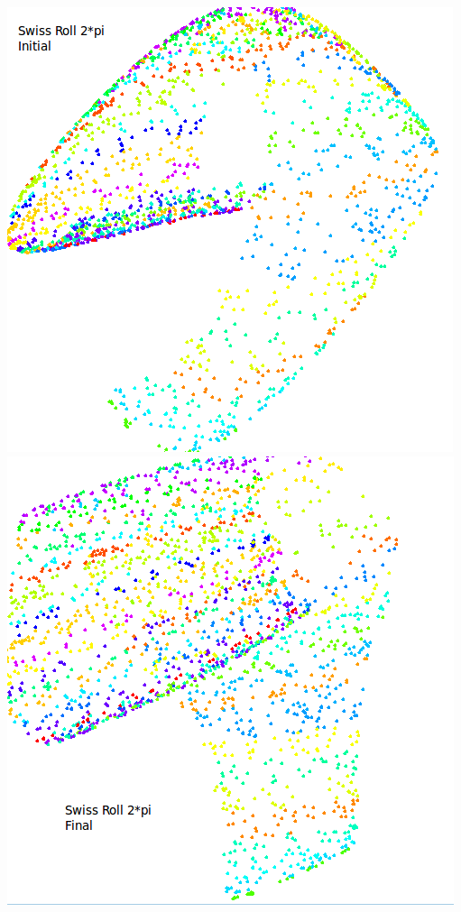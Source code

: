 \documentclass{beamer}
\begin{document}
\begin{frame}
\begin{center}
\includegraphics[scale = 0.20]{s3.png} 
\includegraphics[scale = 0.20]{s4.png} 
\end{center} 
\end{frame} 
\end{document}
